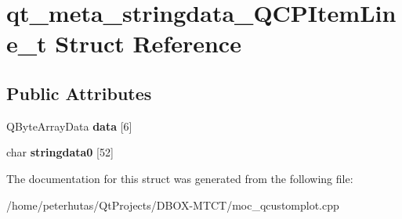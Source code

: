 \hypertarget{structqt__meta__stringdata___q_c_p_item_line__t}{}\section{qt\+\_\+meta\+\_\+stringdata\+\_\+\+Q\+C\+P\+Item\+Line\+\_\+t Struct Reference}
\label{structqt__meta__stringdata___q_c_p_item_line__t}
\subsection*{Public Attributes}
\begin{DoxyCompactItemize}
\item 
\mbox{\label{structqt__meta__stringdata___q_c_p_item_line__t_a4caaf475c8c9a2899091e373fb1c6d49}} 
Q\+Byte\+Array\+Data {\bfseries data} \mbox{[}6\mbox{]}
\item 
\mbox{\label{structqt__meta__stringdata___q_c_p_item_line__t_a35c5e2ac8b06d8035260983dc8b9dafa}} 
char {\bfseries stringdata0} \mbox{[}52\mbox{]}
\end{DoxyCompactItemize}


The documentation for this struct was generated from the following file\+:\begin{DoxyCompactItemize}
\item 
/home/peterhutas/\+Qt\+Projects/\+D\+B\+O\+X-\/\+M\+T\+C\+T/moc\+\_\+qcustomplot.\+cpp\end{DoxyCompactItemize}
